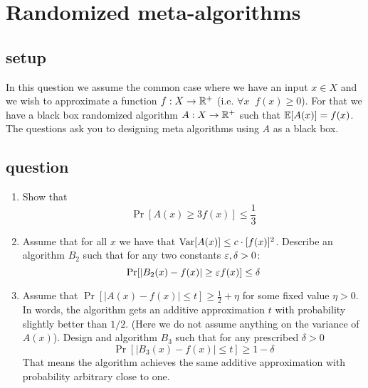 








\section{Randomized meta-algorithms}
\subsection*{setup}
In this question we assume the common case where we have an input $x \in X$  
and we wish to approximate a function $f:X \rightarrow {\mathbb{R}}^+$ (i.e. $\forall x\;\;f(x) \ge 0$).
For that we have a black box randomized algorithm $A:X\rightarrow {\mathbb{R}}^+$ such that ${\mathbb E}[A(x)] = f(x)$.
The questions ask you to designing meta algorithms using $A$ as a black box. 
\subsection*{question}
\begin{enumerate}
\item Show that
\[
\Pr[A(x) \ge 3f(x)] \le \frac{1}{3}
\]
\item Assume that for all $x$ we have that ${\operatorname{Var}}[A(x)] \le c\cdot [f(x)]^2$.
Describe an algorithm $B_2$ such that for any two constants $\varepsilon,\delta > 0$:
\[
\Pr[|B_2(x) - f(x)| \ge \varepsilon f(x)] \le \delta
\]
\item Assume that $\Pr[|A(x) - f(x) | \le t] \ge \frac{1}{2}+\eta$ for some fixed value $\eta > 0$.
In words, the algorithm gets an additive approximation $t$ with probability slightly better than $1/2$.
(Here we do not assume anything on the variance of $A(x)$).
Design and algorithm $B_3$ such that for any prescribed $\delta >0$
\[
\Pr[|B_3(x) - f(x) | \le t] \ge 1 - \delta
\]
That means the algorithm achieves the same additive approximation with probability arbitrary close to one.
\end{enumerate}


\pagebreak


\newcommand{\median}{\operatorname{median}}


